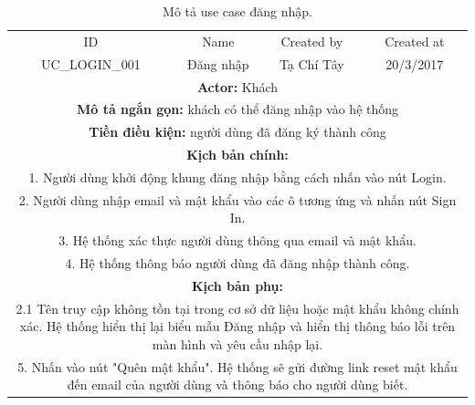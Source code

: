 \documentclass[a4paper,12pt,oneside]{article}
\begin{document}
\begin{table}[!htp]
\centering
\begin{tabularx}{\linewidth}{ |c||c|c|c| }
\hline
ID & Name & Created by & Created at\\
UC\_LOGIN\_001 & Đăng nhập & Tạ Chí Tây & 20/3/2017\\
\hline
\multicolumn{4}{|X|}{\textbf{Actor:} Khách }\\
\hline
\multicolumn{4}{|X|}{\textbf{Mô tả ngắn gọn:} khách có thể đăng nhập vào hệ thống }\\
\hline
\multicolumn{4}{|X|}{\textbf{Tiền điều kiện:} người dùng đã đăng ký thành công}\\
\hline
\multicolumn{4}{|X|}{\textbf{Kịch bản chính:}}\\
\multicolumn{4}{|X|}{1. Người dùng khởi động khung đăng nhập bằng cách nhấn vào nút Login.}\\
\multicolumn{4}{|X|}{
2.	Người dùng nhập email và mật khẩu vào các ô tương ứng và nhấn nút Sign In.}\\
\multicolumn{4}{|X|}{
3.	Hệ thống xác thực người dùng thông qua email và mật khẩu.}\\
\multicolumn{4}{|X|}{
4.	Hệ thống thông báo người dùng đã đăng nhập thành công.}\\
\hline
\multicolumn{4}{|X|}{\textbf{Kịch bản phụ:}}\\
\multicolumn{4}{|X|}{2.1 Tên truy cập không tồn tại trong cơ sở dữ liệu hoặc mật khẩu không chính xác. Hệ thống hiển thị lại biểu mẫu Đăng nhập và hiển thị thông báo lỗi trên màn hình và yêu cầu nhập lại.}\\
\multicolumn{4}{|X|}{5. Nhấn vào nút "Quên mật khẩu". Hệ thống sẽ gửi đường link reset mật khẩu đến email của người dùng và thông báo cho người dùng biết.}\\
\hline

\end{tabularx}
\caption{Mô tả use case đăng nhập.}
\end{table}
\end{document}
